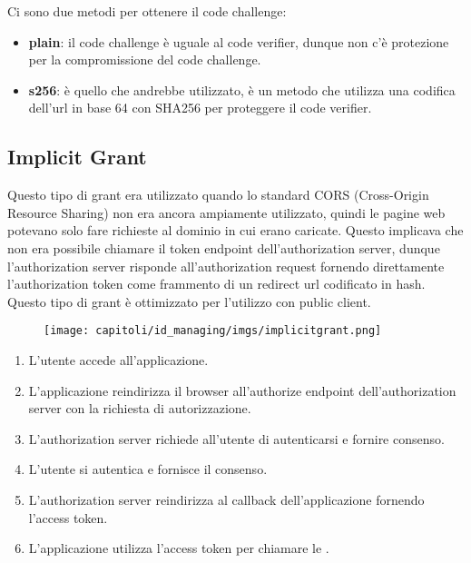 Ci sono due metodi per ottenere il code challenge:

\begin{itemize}
      \item \textbf{plain}: il code challenge è uguale al code verifier, dunque non c'è
            protezione per la compromissione del code challenge.
      \item \textbf{s256}: è quello che andrebbe utilizzato, è un metodo che utilizza
            una codifica dell'url in base 64 con SHA256 per proteggere il code verifier.
\end{itemize}

\subsection{Implicit Grant}

Questo tipo di grant era utilizzato quando lo standard CORS (Cross-Origin Resource
Sharing) non era ancora ampiamente utilizzato, quindi le pagine web potevano solo
fare richieste al dominio in cui erano caricate. Questo implicava che non era possibile
chiamare il token endpoint dell'authorization server, dunque l'authorization server
risponde all'authorization request fornendo direttamente l'authorization token come
frammento di un redirect url codificato in hash.
Questo tipo di grant è ottimizzato per l'utilizzo con public client.

\begin{figure}[H]
      \centering
      \texttt{[image: capitoli/id\_managing/imgs/implicitgrant.png]}
\end{figure}

\begin{enumerate}
      \item L'utente accede all'applicazione.
      \item L'applicazione reindirizza il browser all'authorize endpoint
            dell'authorization server con la richiesta di autorizzazione.
      \item L'authorization server richiede all'utente di autenticarsi e fornire consenso.
      \item L'utente si autentica e fornisce il consenso.
      \item L'authorization server reindirizza al callback dell'applicazione fornendo
            l'access token.
      \item L'applicazione utilizza l'access token per chiamare le \api{}.
\end{enumerate}


